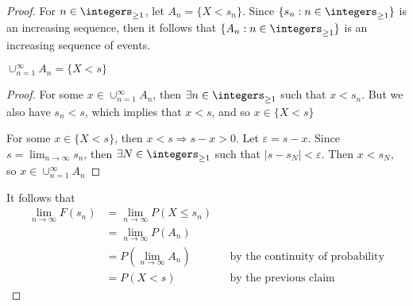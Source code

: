 \documentclass[
  coursecode={MTHE 455},
  assignmentname={Assignment \assignmentnumber},
  studentnumber=20053722,
  name={Bryan Hoang}
]{
  ltxanswer%
}
\begin{document}
  \begin{questions}
    \setcounter{question}{\questionnumber}
    \addtocounter{question}{-1}
    \question{}
    \begin{solution}
      \begin{proof}
        For \(n \in \integers_{\ge 1}\), let \(A_{n} = \{X < s_{n}\}\). Since \(\{s_{n}:n\in\integers_{\ge 1}\}\) is an increasing sequence, then it follows that \(\{A_{n}:n \in \integers_{\ge 1}\}\) is an increasing sequence of events.
        \begin{claim}
          \(\cup_{n=1}^{\infty}A_n = \{X < s\}\)
        \end{claim}
        \begin{proof}
          For some \(x \in \cup_{n=1}^{\infty}A_n\), then \(\exists n \in \integers_{\ge 1}\) such that \(x < s_{n}\). But we also have \(s_{n} < s\), which implies that \(x < s\), and so \(x \in \{X < s\}\)

          For some \(x \in \{X < s\}\), then \(x < s \Rightarrow s-x>0\). Let \(\varepsilon = s-x\). Since \(s = \lim_{n \to \infty}s_{n}\), then \(\exists N \in \integers_{\ge 1}\) such that \(|s-s_{N}|<\varepsilon\). Then \(x < s_{N}\), so \(x \in \cup_{n=1}^{\infty}A_n\)
        \end{proof}
        It follows that
        \begin{align*}
          \lim_{n \to \infty} F(s_{n}) &= \lim_{n \to \infty} P(X \le s_{n})                                            \\
                                       &= \lim_{n \to \infty} P(A_{n})                                                  \\
                                       &= P(\lim_{n \to \infty} A_{n})       & &\text{by the continuity of probability} \\
                                       &= P(X < s)                           & &\text{by the previous claim}
        \end{align*}
      \end{proof}
    \end{solution}
  \end{questions}
\end{document}
